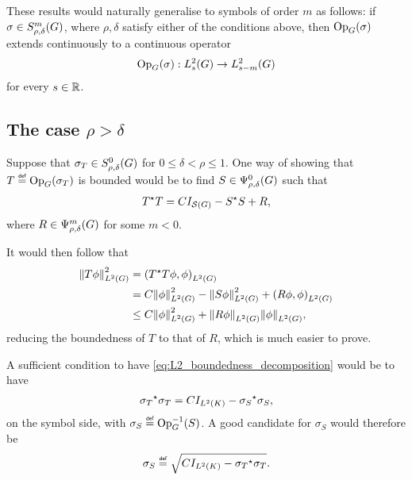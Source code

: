 These results would naturally generalise to symbols of order $m$ as follows:
if $\sigma \in \SymbolClass m {\rho, \delta}$,
where $\rho, \delta$ satisfy either of the conditions above,
then $\Op(\sigma)$ extends continuously to a continuous operator
\begin{align*}
    \Op(\sigma) : \Sobolev s \to \Sobolev {s - m}
\end{align*}
for every $s \in \R$.

\subsection{The case \texorpdfstring{$\rho > \delta$}{rho bigger than delta}}

Suppose that $\sigma_T \in \SymbolClass 0 {\rho, \delta}$ for $0 \leq \delta < \rho \leq 1$.
One way of showing that $T \defeq \Op(\sigma_T)$ is bounded would be to find $S \in \OperatorClass 0 {\rho, \delta}$ such that
\begin{align}
    \adj T T = C \Id {\Schwartz \Group} - \adj S S + R,
    \label{eq:L2_boundedness_decomposition}
\end{align}
where $R \in \OperatorClass m {\rho, \delta}$ for some $m < 0$.

It would then follow that
\begin{align*}
    \norm [\Lebesgue 2 \Group] {T \phi}^2
    &= \ip [\Lebesgue 2 \Group] {\adj T T \phi} \phi\\
    &= C \norm [\Lebesgue 2 \Group] {\phi}^2 - \norm [\Lebesgue 2 \Group] {S \phi}^2 + \ip [\Lebesgue 2 \Group] {R \phi} \phi\\
    &\leq C \norm [\Lebesgue 2 \Group] {\phi}^2 + \norm [\Lebesgue 2 \Group] {R \phi} \norm [\Lebesgue 2 \Group] \phi,
\end{align*}
reducing the boundedness of $T$ to that of $R$,
which is much easier to prove.

A sufficient condition to have \eqref{eq:L2_boundedness_decomposition} would be to have
\begin{align*}
    \adj {\sigma_T} \sigma_T = C \Id {\Lebesgue 2 \CompactGroup} - \adj {\sigma_S} \sigma_S,
\end{align*}
on the symbol side,
with $\sigma_S \defeq \Op^{-1}(S)$.
A good candidate for $\sigma_S$ would therefore be
\begin{align}
    \sigma_S \defeq \sqrt{C \Id {\Lebesgue 2 \CompactGroup} - \adj {\sigma_T} \sigma_T}.
    \label{eq:symbol_to_prove_L2_boundedness}
\end{align}

